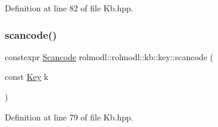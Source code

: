 Definition at line 82 of file Kb.\+hpp.

\mbox{\label{namespacerolmodl_1_1rolmodl_1_1kb_1_1key_a4890bd2c8b69ca02d50c50f7ffa1b90e}} 
\subsubsection{\texorpdfstring{scancode()}{scancode()}}
{\footnotesize\ttfamily constexpr \mbox{\hyperlink{namespacerolmodl_1_1rolmodl_1_1kb_1_1key_af2e2c19a7e4c7347383cae496d850490}{Scancode}} rolmodl\+::rolmodl\+::kb\+::key\+::scancode (\begin{DoxyParamCaption}\item[{const \mbox{\hyperlink{namespacerolmodl_1_1rolmodl_1_1kb_a188e00b289aeb95ae45fb6bf2923e7e2}{Key}}}]{k }\end{DoxyParamCaption})\hspace{0.3cm}{\ttfamily [noexcept]}}



Definition at line 79 of file Kb.\+hpp.

